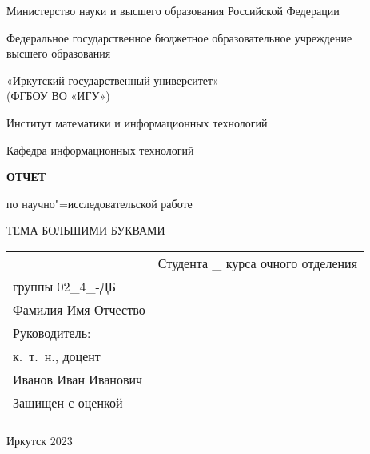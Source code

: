 \documentclass{studrep}
\begin{document}
\thispagestyle{empty}
\begin{center}
Министерство науки и высшего образования Российской Федерации

Федеральное государственное бюджетное образовательное учреждение\\ высшего образования

«Иркутский государственный университет»\\
(ФГБОУ ВО «ИГУ»)

Институт математики и информационных технологий

Кафедра информационных технологий
\end{center}

\vfill
\begin{center}
  \textbf{\large ОТЧЕТ}

  по научно"=исследовательской работе
\vspace{1em}



\vspace{2em}
ТЕМА БОЛЬШИМИ БУКВАМИ

\end{center}
\vfill

\noindent\begin{tabularx}{\textwidth} {
  >{\raggedright\arraybackslash}X
  >{\raggedright}X }
&

Студента \_ курса очного отделения\\
группы 02\_4\_-ДБ\\
Фамилия Имя Отчество\\[2em]

Руководитель:\\
к.~т.~н., доцент\\
\underline{\hspace{3cm}} Иванов Иван Иванович\\[2em]

Защищен с оценкой\\[1em] \underline{\hspace{3cm}}

\end{tabularx}
\vfill
\begin{center}
  Иркутск 2023
\end{center}
\clearpage
\end{document}
